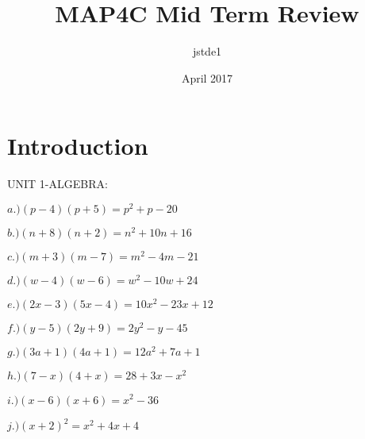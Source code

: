 \documentclass{article}
\title{MAP4C Mid Term Review}
\author{jstde1 }
\date{April 2017}
\begin{document}
\maketitle

\section{Introduction}
UNIT 1-ALGEBRA:

$a.)(p-4)(p+5)=p^2+p-20$

$b.)(n+8)(n+2)=n^2+10n+16$

$c.)(m+3)(m-7)=m^2-4m-21$

$d.)(w-4)(w-6)=w^2-10w+24$

$e.)(2x-3)(5x-4)=10x^2-23x+12$

$f.)(y-5)(2y+9)=2y^2-y-45$

$g.)(3a+1)(4a+1)=12a^2+7a+1$

$h.)(7-x)(4+x)=28+3x-x^2$

$i.)(x-6)(x+6)=x^2-36$

$j.)(x+2)^2=x^2+4x+4$
\end{document}
